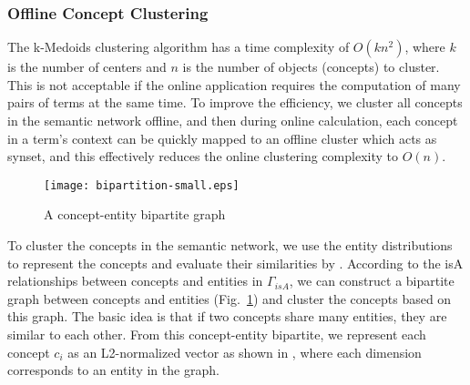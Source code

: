 \subsubsection{Offline Concept Clustering}
The k-Medoids clustering algorithm has a time complexity of $O(kn^{2})$,
where $k$ is the number of centers and $n$ is the number of objects (concepts)
to cluster.
This is not acceptable if the online application requires the computation of
many pairs of terms at the same time. To improve the efficiency, we cluster all concepts
in the semantic network offline, and then during online calculation,
each concept in a term's context can be quickly mapped to an offline cluster
which acts as synset, and this effectively reduces the online clustering
complexity to $O(n)$.

\begin{figure}[th]
 \centerline{
 \texttt{[image: bipartition-small.eps]}}
\caption{A concept-entity bipartite graph} \label{fig:bipartition}
\end{figure}

To cluster the concepts in the semantic network,
we use the entity distributions to represent the concepts and
evaluate their similarities by .
According to the isA relationships between concepts and entities in
$\Gamma_{isA}$, we can construct a bipartite graph
between concepts and entities (Fig.~\ref{fig:bipartition})
and cluster the concepts based on this graph.
The basic idea is that if two concepts share many entities,
they are similar to each other. From this concept-entity bipartite,
we represent each concept $c_i$ as an L2-normalized vector as shown
in , where each dimension corresponds
to an entity in the graph.

